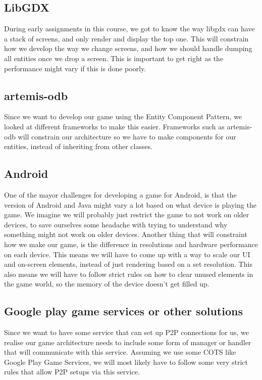 
\subsection{LibGDX}
During early assignments in this course, we got to know the way libgdx can have a stack of screens, and only render and display the top one. This will constrain how we develop the way we change screens, and how we should handle dumping all entities once we drop a screen. This is important to get right as the performance might vary if this is done poorly.
\subsection{artemis-odb}
Since we want to develop our game using the Entity Component Pattern, we looked at different frameworks to make this easier. Frameworks such as artemis-odb will constrain our architecture so we have to make components for our entities, instead of inheriting from other classes.
\subsection{Android}
One of the mayor challenges for developing a game for Android, is that the version of Android and Java might vary a lot based on what device is playing the game. We imagine we will probably just restrict the game to not work on older devices, to save ourselves some headache with trying to understand why something might not work on older devices.
Another thing that will constraint how we make our game, is the difference in resolutions and hardware performance on each device. This means we will have to come up with a way to scale our UI and on-screen elements, instead of just rendering based on a set resolution. This also means we will have to follow strict rules on how to clear unused elements in the game world, so the memory of the device doesn't get filled up.
\subsection{Google play game services or other solutions}
Since we want to have some service that can set up P2P connections for us, we realise our game architecture needs to include some form of manager or handler that will communicate with this service.
Assuming we use some COTS like Google Play Game Services, we will most likely have to follow some very strict rules that allow P2P setups via this service.



